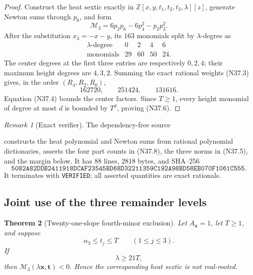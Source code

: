 \documentclass[11pt]{article}
\newtheorem{theorem}{Theorem}[section]
\theoremstyle{definition}
\theoremstyle{remark}
\newtheorem{remark}[theorem]{Remark}
\begin{document}
\begin{proof}
Construct the heat sextic exactly in
\(\mathbb Z[x,y,t_1,t_2,t_3,\lambda][z]\), generate Newton sums through
\(p_6\), and form
\[
 \mathcal M_3=6p_2p_6-6p_4^2-p_2p_3^2.
\tag{N37.7}
\]
After the substitution \(x_3=-x-y\), its \(163\) monomials split by
\(\lambda\)-degree as
\[
\begin{array}{c|rrrr}
\lambda\text{-degree}&0&2&4&6\\ \hline
\text{monomials}&29&60&50&24.
\end{array}
\tag{N37.8}
\]
The center degrees at the first three entries are respectively
\(0,2,4\); their maximum height degrees are \(4,3,2\).  Summing the exact
rational weights \textup{(N37.3)} gives, in the order
\((R_4,R_2,R_0)\),
\[
 162720,\qquad251424,\qquad131616.
\tag{N37.9}
\]
Equation \textup{(N37.4)} bounds the center factors.  Since
\(T\geq1\), every height monomial of degree at most \(d\) is bounded by
\(T^d\), proving \textup{(N37.6)}.
\end{proof}

\begin{remark}[Exact verifier]
\label{rem:f2v37-verifier}
The dependency-free source
\begin{center}
\end{center}
constructs the heat polynomial and Newton sums from rational polynomial
dictionaries, asserts the four part counts in \textup{(N37.8)}, the three
norms in \textup{(N37.5)}, and the margin below.  It has \(88\) lines,
\(2818\) bytes, and SHA--256
\[
\texttt{5082A82DDB2411918DCAF23545BD68D32211359C192A98BD58EB070F1061C555}.
\tag{N37.10}
\]
It terminates with \texttt{VERIFIED}; all asserted quantities are exact
rationals.
\end{remark}

\subsection{Joint use of the three remainder levels}

\begin{theorem}[Twenty-one-slope fourth-minor exclusion]
\label{thm:f2v37-horn}
Let \(A_{\bm x}=1\), let \(T\geq1\), and suppose
\[
 \alpha_3\leq t_j\leq T\qquad(1\leq j\leq3).
\tag{N37.11}
\]
If
\[
 \lambda\geq21T,
\tag{N37.12}
\]
then \(\mathcal M_3(\lambda\bm x,\bm t)<0\).  Hence the corresponding
heat sextic is not real-rooted.
\end{theorem}
\end{document}
